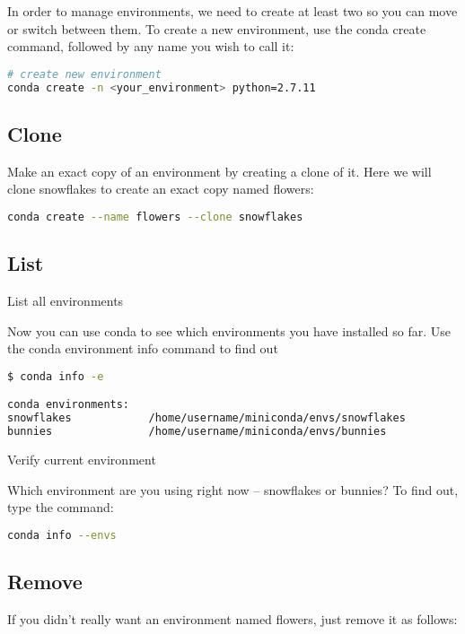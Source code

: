 In order to manage environments, we need to create at least two so you can move or switch between them. To create a new environment, use the conda create command, followed by any name you wish to call it:

\begin{lstlisting}[language=Bash]
# create new environment
conda create -n <your_environment> python=2.7.11
\end{lstlisting}

\subsection{Clone}

Make an exact copy of an environment by creating a clone of it. Here we will clone snowflakes to create an exact copy named flowers:

\begin{lstlisting}[language=bash]
conda create --name flowers --clone snowflakes
\end{lstlisting}

\subsection{List}

List all environments

Now you can use conda to see which environments you have installed so far. Use the conda environment info command to find out

\begin{lstlisting}[language=bash]
$ conda info -e

conda environments:
snowflakes            /home/username/miniconda/envs/snowflakes
bunnies               /home/username/miniconda/envs/bunnies
\end{lstlisting}

Verify current environment

Which environment are you using right now – snowflakes or bunnies? To find out, type the command:

\begin{lstlisting}[language=bash]
conda info --envs
\end{lstlisting}


\subsection{Remove}

If you didn’t really want an environment named flowers, just remove it as follows:


